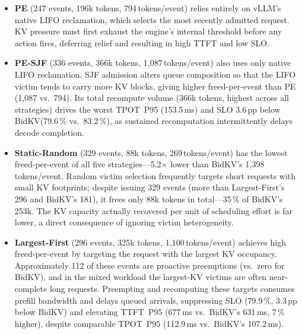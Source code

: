\documentclass[sigconf,nonacm]{acmart}
\newcommand{\bidkv}{BidKV\xspace}
\begin{document}
\begin{itemize}[leftmargin=*,nosep]
\item \textbf{PE} (247 events, 196k tokens, 794\,tokens/event) relies entirely
  on vLLM's native LIFO reclamation, which selects the most recently admitted
  request.  KV pressure must first exhaust the engine's internal threshold
  before any action fires, deferring relief and resulting in high TTFT and
  low SLO.

\item \textbf{PE-SJF} (336 events, 366k tokens, 1{,}087\,tokens/event) also
  uses only native LIFO reclamation.  SJF admission alters queue composition so
  that the LIFO victim tends to carry more KV blocks, giving higher
  freed-per-event than PE (1{,}087 vs.~794).  Its total recompute volume
  (366k tokens, highest across all strategies) drives the worst
  TPOT~P95 (153.5\,ms) and SLO 3.6\,pp below \bidkv (79.6\,\%
  vs.~83.2\,\%), as sustained recomputation intermittently delays decode
  completion.

\item \textbf{Static-Random} (329 events, 88k tokens, 269\,tokens/event) has
  the lowest freed-per-event of all five strategies---5.2$\times$ lower than
  \bidkv's 1{,}398\,tokens/event.  Random victim selection frequently targets
  short requests with small KV footprints; despite issuing 329 events
  (more than Largest-First's 296 and \bidkv's 181),
  it frees only 88k tokens in total---35\,\% of \bidkv's 253k.  The KV capacity actually recovered
  per unit of scheduling effort is far lower, a direct consequence of
  ignoring victim heterogeneity.

\item \textbf{Largest-First} (296 events, 325k tokens, 1{,}100\,tokens/event)
  achieves high freed-per-event by targeting the request with the largest KV
  occupancy.  Approximately 112 of these events are proactive preemptions
  (vs.~zero for \bidkv), and in the mixed workload the largest-KV victims are
  often near-complete long requests.  Preempting and recomputing these targets
  consumes prefill bandwidth and delays queued arrivals, suppressing SLO
  (79.9\,\%, 3.3\,pp below \bidkv) and elevating TTFT~P95
  (677\,ms vs.~\bidkv's 631\,ms, 7\,\% higher), despite comparable
  TPOT~P95 (112.9\,ms vs.~\bidkv's 107.2\,ms).


\end{itemize}
\end{document}
